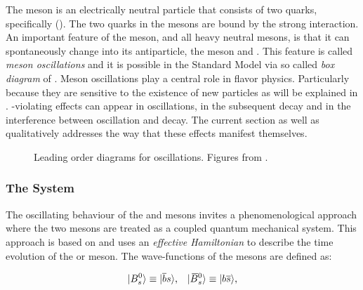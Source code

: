 The \Bs meson is an electrically neutral particle that consists of two quarks, specifically (\bquarkbar\squark).
The two quarks in the mesons are bound by the strong interaction. An important feature of
the \Bs meson, and all heavy neutral mesons, is that it can spontaneously change into its antiparticle,
the \Bsb meson and \viceversa. This feature is called {\it meson oscillations} and it is possible
in the Standard Model via so called {\it box diagram} of .
Meson oscillations play a central role in flavor physics. Particularly because they are sensitive to the
existence of new particles as will be explained in . \CP-violating effects can
appear in \BBbarSyst oscillations, in the subsequent decay and in the interference between oscillation
and decay. The current section as well as  qualitatively addresses the way that
these effects manifest themselves.

\begin{figure}[!h]
  \centering
  \begin{subfigure}{0.5\textwidth}
    \centering
    \raggedright
    \scalebox{0.9}{\sffamily }
    \caption{}
    \label{bs_box_1}
  \end{subfigure}%
  \hfill%
  \begin{subfigure}{0.5\textwidth}
    \centering
    \raggedleft
    \scalebox{0.9}{\sffamily }
    \caption{}
    \label{bs_box_2}
  \end{subfigure}
  \caption{Leading order diagrams for \BBbarSyst oscillations. Figures from \cite{jeroenThesis}.}
  \label{bs_box}
\end{figure}

\subsubsection{The \BBbarSyst System}
\label{the_bbar_system}

The oscillating behaviour of the \Bs and \Bsb mesons invites a phenomenological approach
where the two mesons are treated as a coupled quantum mechanical system. This approach
is based on \cite{Weisskopf:1930au,Weisskopf:1930ps} and uses an {\it effective Hamiltonian}\cite{eff-hamiltonian-bs-syst,DeBruyn-thesis}
to describe the time evolution of the \Bs or \Bsb meson. The wave-functions of the mesons
are defined as:

\begin{equation}
  \centering
  \ket{\Bs}  \equiv  \ket{\bquarkbar\squark}, \;\;\; \ket{\Bsb} \equiv  \ket{\bquark\squarkbar},
  \label{bs_wavefunctions}
\end{equation}

